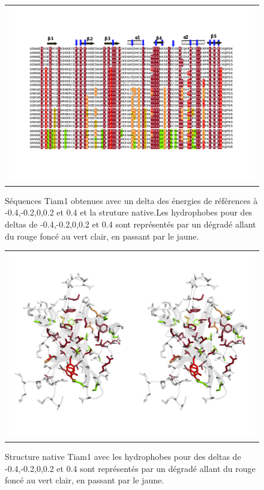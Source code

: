     \begin{figure}[h]
      \centering
      \begin{tabular}{c}
        \includegraphics[width=14cm]{titration/alignTiam1.png} \\
      \end{tabular}

      \caption{\small Séquences Tiam1 obtenues avec un delta des énergies de références à -0.4,-0.2,0,0.2 et 0.4 et la struture native.Les hydrophobes pour des deltas de -0.4,-0.2,0,0.2 et 0.4 sont représentés par un dégradé allant du rouge foncé au vert clair, en passant par le jaune.}
      
      \label{titration_Tiam1}
    \end{figure}


    \begin{figure}[h]
      \centering
      \begin{tabular}{c}
        \includegraphics[width=15cm]{titration/structure_Tiam1.png} \\
      \end{tabular}

      \caption{\small Structure native Tiam1 avec les hydrophobes pour des deltas de -0.4,-0.2,0,0.2 et 0.4 sont représentés par un dégradé allant du rouge foncé au vert clair, en passant par le jaune.}
      
      \label{titration_Tiam1}
    \end{figure}

